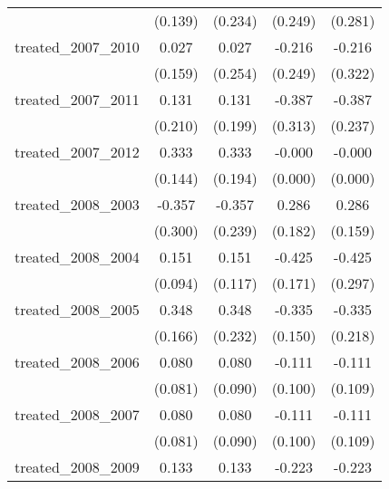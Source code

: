 {\begin{tabular}{l*{4}{c}}
            &     (0.139)         &     (0.234)         &     (0.249)         &     (0.281)         \\
[1em]
treated\_2007\_2010&       0.027         &       0.027         &      -0.216         &      -0.216         \\
            &     (0.159)         &     (0.254)         &     (0.249)         &     (0.322)         \\
[1em]
treated\_2007\_2011&       0.131         &       0.131         &      -0.387         &      -0.387         \\
            &     (0.210)         &     (0.199)         &     (0.313)         &     (0.237)         \\
[1em]
treated\_2007\_2012&       0.333\sym{*}  &       0.333         &      -0.000         &      -0.000         \\
            &     (0.144)         &     (0.194)         &     (0.000)         &     (0.000)         \\
[1em]
treated\_2008\_2003&      -0.357         &      -0.357         &       0.286         &       0.286         \\
            &     (0.300)         &     (0.239)         &     (0.182)         &     (0.159)         \\
[1em]
treated\_2008\_2004&       0.151         &       0.151         &      -0.425\sym{*}  &      -0.425         \\
            &     (0.094)         &     (0.117)         &     (0.171)         &     (0.297)         \\
[1em]
treated\_2008\_2005&       0.348\sym{*}  &       0.348         &      -0.335\sym{*}  &      -0.335         \\
            &     (0.166)         &     (0.232)         &     (0.150)         &     (0.218)         \\
[1em]
treated\_2008\_2006&       0.080         &       0.080         &      -0.111         &      -0.111         \\
            &     (0.081)         &     (0.090)         &     (0.100)         &     (0.109)         \\
[1em]
treated\_2008\_2007&       0.080         &       0.080         &      -0.111         &      -0.111         \\
            &     (0.081)         &     (0.090)         &     (0.100)         &     (0.109)         \\
[1em]
treated\_2008\_2009&       0.133         &       0.133         &      -0.223         &      -0.223         \\

\end{tabular}}
